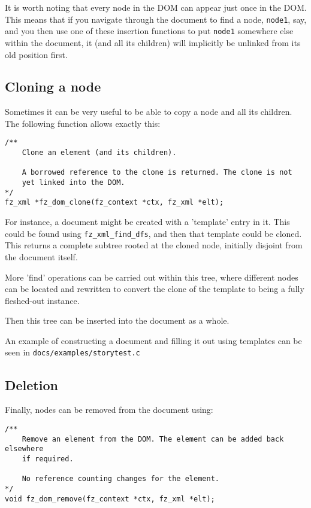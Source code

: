 \documentclass[oneside]{book}
\begin{document}
It is worth noting that every node in the DOM can appear just once in the DOM. This means that if you navigate through the document to find a node, \texttt{node1}, say, and you then use one of these insertion functions to put \texttt{node1} somewhere else within the document, it (and all its children) will implicitly be unlinked from its old position first.

\subsection{Cloning a node}

Sometimes it can be very useful to be able to copy a node and all its children. The following function allows exactly this:

\begin{lstlisting}
/**
	Clone an element (and its children).

	A borrowed reference to the clone is returned. The clone is not
	yet linked into the DOM.
*/
fz_xml *fz_dom_clone(fz_context *ctx, fz_xml *elt);
\end{lstlisting}

For instance, a document might be created with a 'template' entry in it. This could be found using \texttt{fz\_xml\_find\_dfs}, and then that template could be cloned. This returns a complete subtree rooted at the cloned node, initially disjoint from the document itself.

More 'find' operations can be carried out within this tree, where different nodes can be located and rewritten to convert the clone of the template to being a fully fleshed-out instance.

Then this tree can be inserted into the document as a whole.

An example of constructing a document and filling it out using templates can be seen in \texttt{docs/examples/storytest.c}

\subsection{Deletion}

Finally, nodes can be removed from the document using:

\begin{lstlisting}
/**
	Remove an element from the DOM. The element can be added back elsewhere
	if required.

	No reference counting changes for the element.
*/
void fz_dom_remove(fz_context *ctx, fz_xml *elt);
\end{lstlisting}
\end{document}
